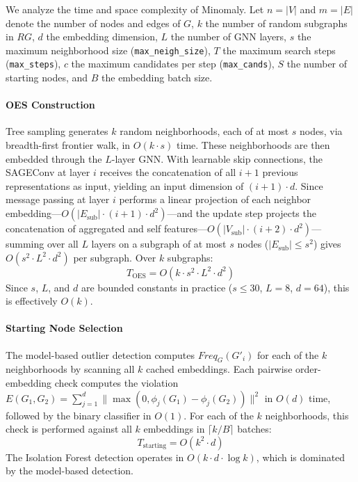 \documentclass[pdflatex,sn-mathphys-num]{sn-jnl}%
\theoremstyle{thmstyleone}%
\theoremstyle{thmstyletwo}%
\theoremstyle{thmstylethree}%
\begin{document}
{\color{blue}
We analyze the time and space complexity of Minomaly. Let $n = |V|$ and $m = |E|$ denote the number of nodes and edges of $G$, $k$ the number of random subgraphs in $RG$, $d$ the embedding dimension, $L$ the number of GNN layers, $s$ the maximum neighborhood size (\texttt{max\_neigh\_size}), $T$ the maximum search steps (\texttt{max\_steps}), $c$ the maximum candidates per step (\texttt{max\_cands}), $S$ the number of starting nodes, and $B$ the embedding batch size.

\paragraph{OES Construction}
Tree sampling generates $k$ random neighborhoods, each of at most $s$ nodes, via breadth-first frontier walk, in $O(k \cdot s)$ time.
These neighborhoods are then embedded through the $L$-layer GNN.
With learnable skip connections, the SAGEConv at layer $i$ receives the concatenation of all $i{+}1$ previous representations as input, yielding an input dimension of $(i{+}1) \cdot d$.
Since message passing at layer $i$ performs a linear projection of each neighbor embedding---$O(|E_{\text{sub}}| \cdot (i{+}1) \cdot d^2)$---and the update step projects the concatenation of aggregated and self features---$O(|V_{\text{sub}}| \cdot (i{+}2) \cdot d^2)$---summing over all $L$ layers on a subgraph of at most $s$ nodes ($|E_{\text{sub}}| \leq s^2$) gives $O(s^2 \cdot L^2 \cdot d^2)$ per subgraph. Over $k$ subgraphs:
\begin{equation}
\label{eq:oes_complexity}
T_{\text{OES}} = O\!\left(k \cdot s^2 \cdot L^2 \cdot d^2\right)
\end{equation}
Since $s$, $L$, and $d$ are bounded constants in practice ($s \leq 30$, $L = 8$, $d = 64$), this is effectively $O(k)$.

\paragraph{Starting Node Selection}
The model-based outlier detection computes $Freq_G(G'_i)$ for each of the $k$ neighborhoods by scanning all $k$ cached embeddings. Each pairwise order-embedding check computes the violation $E(G_1, G_2) = \sum_{j=1}^{d} \|\max(0, \phi_j(G_1) - \phi_j(G_2))\|^2$ in $O(d)$ time, followed by the binary classifier in $O(1)$. For each of the $k$ neighborhoods, this check is performed against all $k$ embeddings in $\lceil k/B \rceil$ batches:
\begin{equation}
\label{eq:starting_complexity}
T_{\text{starting}} = O(k^2 \cdot d)
\end{equation}
The Isolation Forest detection operates in $O(k \cdot d \cdot \log k)$, which is dominated by the model-based detection.

}
\end{document}
